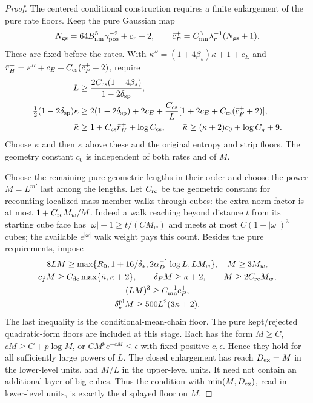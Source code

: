\documentclass[11pt,letterpaper,reqno]{amsart}
\theoremstyle{definition}
\theoremstyle{remark}
\begin{document}
\begin{proof}
The centered conditional construction requires a finite
enlargement of the pure rate floors. Keep the pure Gaussian
map
\[
 N_{\rm gs}=64B_{\rm nm}^5\gamma_{\rm pos}^{-2}+c_r+2,
 \qquad
 \bar c_P^+=C_{\rm mn}^3\lambda_r^{-1}(N_{\rm gs}+1).
\]
These are fixed before the rates. With
$\kappa''=(1+4\beta_s)\kappa+1+c_E$ and
$\bar r_H^+=\kappa''+c_E+C_{\rm cs}(\bar c_P^++2)$, require
\[
\begin{split}
 L&\ge\frac{2C_{\rm cs}(1+4\beta_s)}{1-2\delta_{\rm sp}},\\
 \tfrac12(1-2\delta_{\rm sp})\kappa
 &\ge2(1-2\delta_{\rm sp})+2c_E
    +\frac{C_{\rm cs}}L[1+2c_E+C_{\rm cs}(\bar c_P^++2)],\\
 \bar\kappa&\ge1+C_{\rm cs}\bar r_H^++\log C_{\rm cs},
 \qquad
 \bar\kappa\ge(\kappa+2)c_0+\log C_g+9.
\end{split}
\]
Choose $\kappa$ and then $\bar\kappa$ above these and the
original entropy and strip floors. The geometry constant
$c_0$ is independent of both rates and of $M$.

Choose the remaining pure geometric lengths in their order
and choose the power $M=L^{m'}$ last among the lengths.
Let $C_{\rm rc}$ be the geometric constant for recounting localized
mass-member walks through cubes: the extra norm factor is at most
$1+C_{\rm rc}M_w/M$. Indeed a walk reaching beyond distance $t$
from its starting cube face has $|\omega|+1\ge t/(CM_w)$ and
meets at most $C(1+|\omega|)^3$ cubes; the available
$e^{|\omega|}$ walk weight pays this count.
Besides the pure requirements, impose
\[
\begin{gathered}
 8LM\ge\max\{R_0,1+16/\delta_*,2\alpha_D^{-1}\log L,LM_w\},
 \quad M\ge3M_w,\\
 c_fM\ge C_{\rm dc}\max\{\bar\kappa,\kappa+2\},\qquad
 \delta_FM\ge\kappa+2,\qquad M\ge2C_{\rm rc}M_w,\\
 (LM)^3\ge C_{\rm mn}^{-1}\bar c_P^+,\\
 \delta_\star^{\rm pl}M\ge500L^2(3\kappa+2).
\end{gathered}
\]
The last inequality is the conditional-mean-chain
floor. The pure kept/rejected quadratic-form floors are
included at this stage. Each has the form $M\ge C$,
$cM\ge C+p\log M$, or $CM^pe^{-cM}\le\epsilon$ with
fixed positive $c,\epsilon$. Hence they hold for all
sufficiently large powers of $L$.
The closed enlargement has reach $D_{\rm ex}=M$ in the
lower-level units, and $M/L$ in the upper-level units.
It need not contain an additional layer of big cubes.
Thus the condition with $\min(M,D_{\rm ex})$, read in
lower-level units, is exactly the displayed floor on $M$.


\end{proof}
\end{document}
